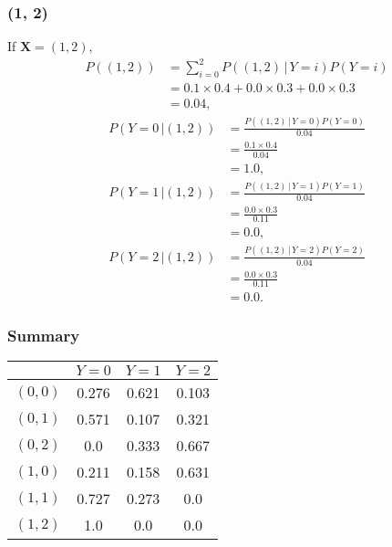 \documentclass[10pt]{article}
\begin{document}
\subsubsection*{(1, 2)}
If $\textbf{X} = (1, 2)$, 
\begin{align*}
P((1, 2)) &= \sum_{i = 0}^2 P((1, 2) \, | \, Y = i)P(Y = i) \\
             &= 0.1 \times 0.4 + 0.0 \times 0.3 + 0.0 \times 0.3 \\
             &= 0.04,
\end{align*}
\begin{align*}
P(Y = 0 \, | (1,2)) &= \frac{P((1, 2) \, | \, Y = 0)P(Y = 0)}{ 0.04 } \\
                           &= \frac{0.1 \times 0.4}{ 0.04 } \\
                           &= 1.0,
\end{align*}
\begin{align*}
P(Y = 1 \, | (1,2)) &= \frac{ P((1, 2) \, | \, Y = 1)P(Y = 1) }{ 0.04 } \\
                           &= \frac{ 0.0 \times 0.3 }{ 0.11 } \\
                           &= 0.0,
\end{align*}
\begin{align*}
P(Y = 2 \, | (1,2)) &= \frac{P((1, 2) \, | \, Y = 2)P(Y = 2)}{ 0.04 } \\
                           &= \frac{ 0.0 \times 0.3 }{ 0.11 } \\
                           &= 0.0.
\end{align*}

\subsubsection*{Summary}
\begin{tabular}[H]{|l|c|c|c|}
  \hline
  & $Y = 0$ & $Y = 1$ & $Y = 2$ \\
  \hline
  $(0, 0)$ & 0.276 & 0.621 & 0.103 \\
  \hline
  $(0, 1)$ & 0.571 & 0.107 & 0.321 \\
  \hline
  $(0, 2)$ & 0.0 & 0.333 & 0.667 \\
  \hline
  $(1, 0)$ & 0.211 & 0.158 & 0.631 \\
  \hline
  $(1, 1)$ & 0.727 & 0.273 & 0.0 \\
  \hline
  $(1, 2)$ & 1.0 & 0.0 & 0.0 \\
  \hline
\end{tabular}
\end{document}
